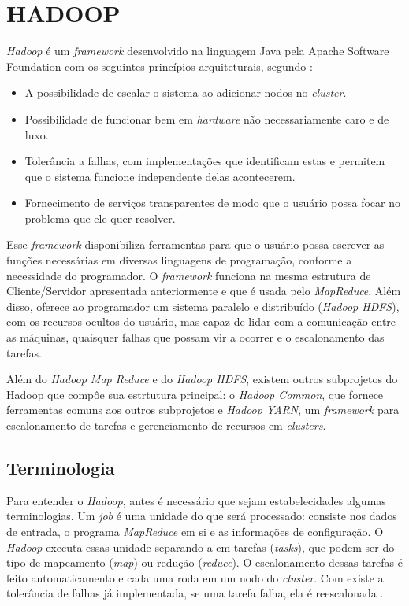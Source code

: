 
\section{HADOOP} \label{sec:hadoop}

\textit{Hadoop} é um \textit{framework} desenvolvido na linguagem Java pela Apache Software Foundation com os seguintes princípios arquiteturais, segundo \textcite{ImprovingNavarro18}:
\begin{itemize}
  \item A possibilidade de escalar o sistema ao adicionar nodos no \textit{cluster}.
  \item Possibilidade de funcionar bem em \textit{hardware} não necessariamente caro e de luxo.
  \item Tolerância a falhas, com implementações que identificam estas e permitem que o sistema funcione independente delas acontecerem.
  \item Fornecimento de serviços transparentes de modo que o usuário possa focar no problema que ele quer resolver.
\end{itemize}

Esse \textit{framework} disponibiliza ferramentas para que o usuário possa escrever as funções necessárias em diversas linguagens de programação, conforme a necessidade do programador. O \textit{framework} funciona na mesma estrutura de Cliente/Servidor apresentada anteriormente e que é usada pelo \textit{MapReduce}. Além disso, oferece ao programador um sistema paralelo e distribuído (\textit{Hadoop HDFS}), com os recursos ocultos do usuário, mas capaz de lidar com a comunicação entre as máquinas, quaisquer falhas que possam vir a ocorrer e o escalonamento das tarefas.

Além do \textit{Hadoop Map Reduce} e do \textit{Hadoop HDFS}, existem outros subprojetos do Hadoop que compôe sua estrtutura principal: o \textit{Hadoop Common}, que fornece ferramentas comuns aos outros subprojetos e \textit{Hadoop YARN}, um \textit{framework} para escalonamento de tarefas e gerenciamento de recursos em \textit{clusters}.

\subsection{Terminologia}\label{ssec:mapreduceterminlogia}

Para entender o \textit{Hadoop}, antes é necessário que sejam estabelecidades algumas terminologias. Um \textit{job} é uma unidade do que será processado: consiste nos dados de entrada, o programa \textit{MapReduce} em si e as informações de configuração. O \textit{Hadoop} executa essas unidade separando-a em tarefas (\textit{tasks}), que podem ser do tipo de mapeamento (\textit{map}) ou redução (\textit{reduce}). O escalonamento dessas tarefas é feito automaticamento e cada uma roda em um nodo do \textit{cluster}. Com existe a tolerância de falhas já implementada, se uma tarefa falha, ela é reescalonada \cite{HadoopBook15}.

